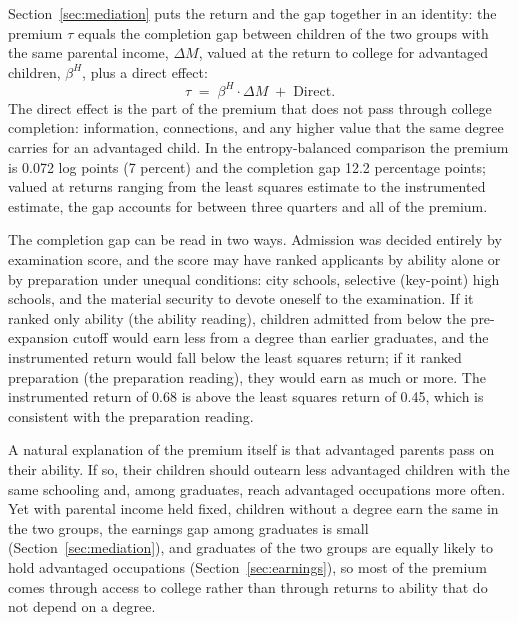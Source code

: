 \documentclass[11pt]{article}
\begin{document}
Section~\ref{sec:mediation} puts the return and the gap together in an identity: the premium $\tau$ equals the completion gap between children of the two groups with the same parental income, $\Delta M$, valued at the return to college for advantaged children, $\beta^{H}$, plus a direct effect:
\begin{equation}
\tau \;=\; \beta^{H} \cdot \Delta M \;+\; \mathrm{Direct}.
\label{eq:hp-intro}
\end{equation}
The direct effect is the part of the premium that does not pass through college completion: information, connections, and any higher value that the same degree carries for an advantaged child. In the entropy-balanced comparison the premium is 0.072 log points (7 percent) and the completion gap 12.2 percentage points; valued at returns ranging from the least squares estimate to the instrumented estimate, the gap accounts for between three quarters and all of the premium.

The completion gap can be read in two ways. Admission was decided entirely by examination score, and the score may have ranked applicants by ability alone or by preparation under unequal conditions: city schools, selective (key-point) high schools, and the material security to devote oneself to the examination. If it ranked only ability (the ability reading), children admitted from below the pre-expansion cutoff would earn less from a degree than earlier graduates, and the instrumented return would fall below the least squares return; if it ranked preparation (the preparation reading), they would earn as much or more. The instrumented return of 0.68 is above the least squares return of 0.45, which is consistent with the preparation reading.

A natural explanation of the premium itself is that advantaged parents pass on their ability. If so, their children should outearn less advantaged children with the same schooling and, among graduates, reach advantaged occupations more often. Yet with parental income held fixed, children without a degree earn the same in the two groups, the earnings gap among graduates is small (Section~\ref{sec:mediation}), and graduates of the two groups are equally likely to hold advantaged occupations (Section~\ref{sec:earnings}), so most of the premium comes through access to college rather than through returns to ability that do not depend on a degree.
\end{document}
